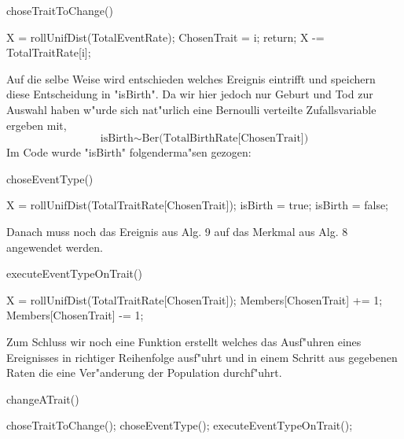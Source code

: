 \documentclass[11pt, a4paper, german]{article}
\theoremstyle{plain}
\begin{document}
	\begin{algorithm}[H]
 		\caption{choseTraitToChange()}
 		\begin{algorithmic}[1]
 			\STATE X = rollUnifDist(TotalEventRate);
 					\STATE ChosenTrait = i;
 					\STATE return;
 				\ENDIF
 				\STATE X -= TotalTraitRate[i];
 			\ENDFOR
 		\end{algorithmic}
 	\end{algorithm}
 	Auf die selbe Weise wird entschieden welches Ereignis eintrifft und speichern diese Entscheidung in "{}isBirth"{}. Da wir hier jedoch nur Geburt und Tod zur Auswahl haben w"urde sich nat"urlich eine Bernoulli verteilte Zufallsvariable ergeben mit, 
 	\[ \text{isBirth} \sim \text{Ber(TotalBirthRate[ChosenTrait])} \]
 	Im Code wurde "{}isBirth"{} folgenderma"sen gezogen:
	\begin{algorithm}[H]
 		\caption{choseEventType()}
 		\begin{algorithmic}[1]
 			\STATE X = rollUnifDist(TotalTraitRate[ChosenTrait]);
 				\STATE isBirth = true;
 			\ELSE
 				\STATE isBirth = false;
 			\ENDIF
 		\end{algorithmic}
 	\end{algorithm}
 	Danach muss noch das Ereignis aus Alg. 9 auf das Merkmal aus Alg. 8 angewendet werden.
	\begin{algorithm}[H]
 		\caption{executeEventTypeOnTrait()}
 		\begin{algorithmic}[1]
 			\STATE X = rollUnifDist(TotalTraitRate[ChosenTrait]);
 				\STATE Members[ChosenTrait] += 1;
 			\ENDIF
 				\STATE Members[ChosenTrait] -= 1;
 			\ENDIF
 		\end{algorithmic}
 	\end{algorithm} 	
 	Zum Schluss wir noch eine Funktion erstellt welches das Ausf"uhren eines Ereignisses in richtiger Reihenfolge ausf"uhrt und in einem Schritt aus gegebenen Raten die eine Ver"anderung der Population durchf"uhrt.
 	\begin{algorithm}[H]
 		\caption{changeATrait()}
 		\begin{algorithmic}[1]
 			\STATE choseTraitToChange();
 			\STATE choseEventType();
 			\STATE executeEventTypeOnTrait();
 		\end{algorithmic}
 	\end{algorithm} 
\end{document}
